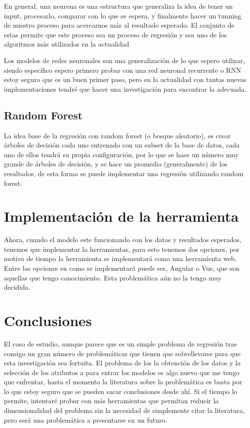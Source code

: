 \documentclass{article}
\begin{document}
En general, una neurona es una estructura que generaliza la idea de tener un
input, procesarlo, comparar con lo que se espera, y finalmente hacer un tunning
de nuestro proceso para acercarnos más al resultado esperado. El conjunto de
estas permite que este proceso sea un proceso de regresión y  sea uno de los
algoritmos más utilizados en la actualidad

Los modelos de redes neuronales son una generalización de lo que espero
utilizar, siendo específico espero primero probar con una red neuronal
recurrente o RNN \cite{DBL}
estoy seguro que es un buen primer paso, pero en la actualidad con tantas nuevas
implementaciones tendré que hacer una investigación para encontrar la adecuada.

\subsection{ Random Forest }
La idea base de la regresión con random forest (o bosque aleatorio), es crear
árboles de decisión cada uno entrenado con un subset de la base de datos, cada
uno de ellos tendrá su propia configuración, por lo que se hace un número muy grande
de árboles de decisión, y se hace un promedio (generalmente) de los resultados,
de esta forma se puede implementar una regresión utilizando random forest.
\cite{Breiman2001}

\section{Implementación de la herramienta}
Ahora, cuando el modelo este funcionando con los datos y resultados esperados,
tenemos que implementar la herramientas, para esto tenemos dos opciones, por
motivo de tiempo la herramienta se implementará como una herramienta web. Entre
las opciones en como se implementará puede ser, Angular o Vue, que son aquellas
que tengo conocimiento.
Esta problemática aún no la tengo muy decidida.

\section{Conclusiones}
El caso de estudio, aunque parece que es un simple problema de regresión trae
consigo un gran número de problemáticas que tienen que sobrellevarse para que
esta investigación sea fortuita. El problema de los la obtención de los datos y
la selección de los atributos a para entrar los modelos es algo nuevo que me
tengo que enfrentar, hasta el momento la literatura sobre la problemática es
basta por lo que estoy seguro que se pueden sacar conclusiones desde ahí. Si el
tiempo lo permite, intentaré probar con más herramientas que permitan reducir la
dimensionalidad del problema sin la necesidad de simplemente citar la
literatura, pero será una problemática a presentarse en un futuro.\\
\end{document}
